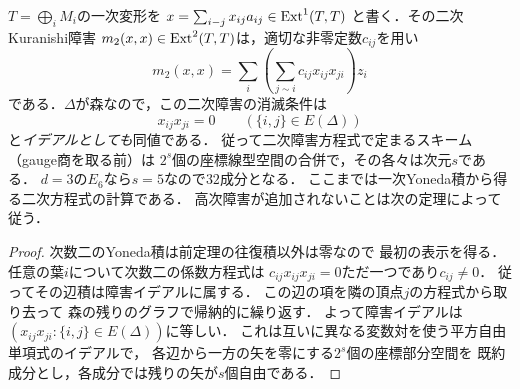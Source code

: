 \begin{corollary}[二次Kuranishi障害のpreprojective型表示]
\label{cor:zigzag-quadratic}
$T=\bigoplus_iM_i$の一次変形を
$x=\sum_{i-j}x_{ij}a_{ij}\in\operatorname{Ext}^1(T,T)$
と書く．その二次Kuranishi障害
$m_2(x,x)\in\operatorname{Ext}^2(T,T)$は，適切な非零定数$c_{ij}$を用い
\[
m_2(x,x)=\sum_i
\left(\sum_{j\sim i}c_{ij}x_{ij}x_{ji}\right)z_i
\]
である．$\Delta$が森なので，この二次障害の消滅条件は
\[
\boxed{x_{ij}x_{ji}=0\qquad(\{i,j\}\in E(\Delta))}
\]
と\emph{イデアルとしても}同値である．
従って二次障害方程式で定まるスキーム（gauge商を取る前）は
$2^s$個の座標線型空間の合併で，その各々は次元$s$である．
$d=3$の$E_6$なら$s=5$なので$32$成分となる．
ここまでは一次Yoneda積から得る二次方程式の計算である．
高次障害が追加されないことは次の定理によって従う．
\end{corollary}
\begin{proof}
次数二のYoneda積は前定理の往復積以外は零なので
最初の表示を得る．
任意の葉$i$について次数二の係数方程式は
$c_{ij}x_{ij}x_{ji}=0$ただ一つであり$c_{ij}\ne0$．
従ってその辺積は障害イデアルに属する．
この辺の項を隣の頂点$j$の方程式から取り去って
森の残りのグラフで帰納的に繰り返す．
よって障害イデアルは
$(x_{ij}x_{ji}:\{i,j\}\in E(\Delta))$に等しい．
これは互いに異なる変数対を使う平方自由単項式のイデアルで，
各辺から一方の矢を零にする$2^s$個の座標部分空間を
既約成分とし，各成分では残りの矢が$s$個自由である．
\end{proof}


